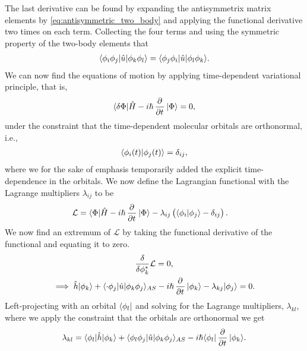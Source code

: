         The last derivative can be found by expanding the antisymmetrix matrix
        elements by \autoref{eq:antisymmetric_two_body} and applying the
        functional derivative two times on each term. Collecting the four terms
        and using the symmetric property of the two-body elements that
        \begin{align}
            \langle \phi_i\phi_j |\hat{u}| \phi_k\phi_l \rangle
            = \langle \phi_j\phi_i |\hat{u}| \phi_l\phi_k \rangle.
        \end{align}
        We can now find the equations of motion by applying time-dependent
        variational principle, that is,
        \begin{align}
            \bra{\delta\Phi}\hat{H} - i\hslash\dpd{}{t}\ket{\Phi} = 0,
        \end{align}
        under the constraint that the time-dependent molecular orbitals are
        orthonormal, i.e.,
        \begin{align}
            \langle \phi_i(t) | \phi_j(t) \rangle = \delta_{ij},
        \end{align}
        where we for the sake of emphasis temporarily added the explicit
        time-dependence in the orbitals. We now define the Lagrangian functional
        with the Lagrange multipliers $\lambda_{ij}$ to be
        \begin{align}
            \mathcal{L}
            &= \bra{\Phi}\hat{H} - i\hslash\dpd{}{t}\ket{\Phi}
            - \lambda_{ij}\para{
                \braket{\phi_i}{\phi_j} - \delta_{ij}
            }.
        \end{align}
        We now find an extremum of $\mathcal{L}$ by taking the functional
        derivative of the functional and equating it to zero.
        \begin{gather}
            \dfd{\phi_k^{*}}\mathcal{L} = 0, \\
            \implies
            \hat{h}\ket{\phi_k}
            + \bra{\cdot\phi_j}\hat{u}\ket{\phi_k\phi_j}_{AS}
            - i\hslash\dpd{}{t}\ket{\phi_k}
            - \lambda_{kj}\ket{\phi_j} = 0.
            \label{eq:extremum_lagrangian}
        \end{gather}
        Left-projecting with an orbital $\langle \phi_l |$ and solving for the
        Lagrange multipliers, $\lambda_{kl}$, where we apply the constraint that
        the orbitals are orthonormal we get
        \begin{align}
            \lambda_{kl}
            =
            \bra{\phi_l}\hat{h}\ket{\phi_k}
            + \bra{\phi_l\phi_j}\hat{u}\ket{\phi_k\phi_j}_{AS}
            - i\hslash\bra{\phi_l}\dpd{}{t}\ket{\phi_k}.
            \label{eq:lagrange_multipliers}
        \end{align}
